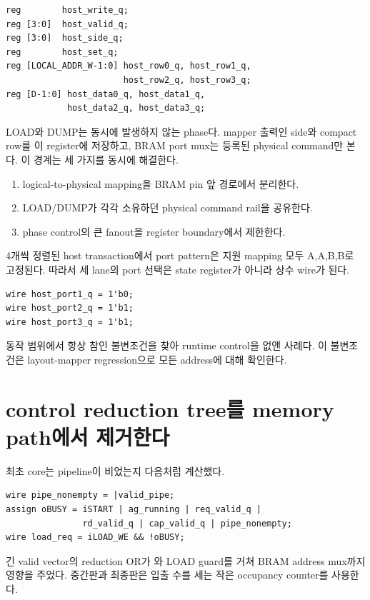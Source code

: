 \begin{lstlisting}
reg        host_write_q;
reg [3:0]  host_valid_q;
reg [3:0]  host_side_q;
reg        host_set_q;
reg [LOCAL_ADDR_W-1:0] host_row0_q, host_row1_q,
                       host_row2_q, host_row3_q;
reg [D-1:0] host_data0_q, host_data1_q,
            host_data2_q, host_data3_q;
\end{lstlisting}

LOAD와 DUMP는 동시에 발생하지 않는 phase다. mapper 출력인 side와 compact row를
이 register에 저장하고, BRAM port mux는 등록된 physical command만 본다. 이
경계는 세 가지를 동시에 해결한다.

\begin{enumerate}
  \item logical-to-physical mapping을 BRAM pin 앞 경로에서 분리한다.
  \item LOAD/DUMP가 각각 소유하던 physical command rail을 공유한다.
  \item phase control의 큰 fanout을 register boundary에서 제한한다.
\end{enumerate}

4개씩 정렬된 host transaction에서 port pattern은 지원 mapping 모두 A,A,B,B로
고정된다. 따라서 세 lane의 port 선택은 state register가 아니라 상수 wire가 된다.

\begin{lstlisting}
wire host_port1_q = 1'b0;
wire host_port2_q = 1'b1;
wire host_port3_q = 1'b1;
\end{lstlisting}

동작 범위에서 항상 참인 불변조건을 찾아 runtime control을 없앤 사례다. 이
불변조건은 layout-mapper regression으로 모든 address에 대해 확인한다.

\section{control reduction tree를 memory path에서 제거한다}

최초 core는 pipeline이 비었는지 다음처럼 계산했다.

\begin{lstlisting}
wire pipe_nonempty = |valid_pipe;
assign oBUSY = iSTART | ag_running | req_valid_q |
               rd_valid_q | cap_valid_q | pipe_nonempty;
wire load_req = iLOAD_WE && !oBUSY;
\end{lstlisting}

긴 valid vector의 reduction OR가 와 LOAD guard를 거쳐 BRAM address
mux까지 영향을 주었다. 중간판과 최종판은 입출 수를 세는 작은 occupancy
counter를 사용한다.

